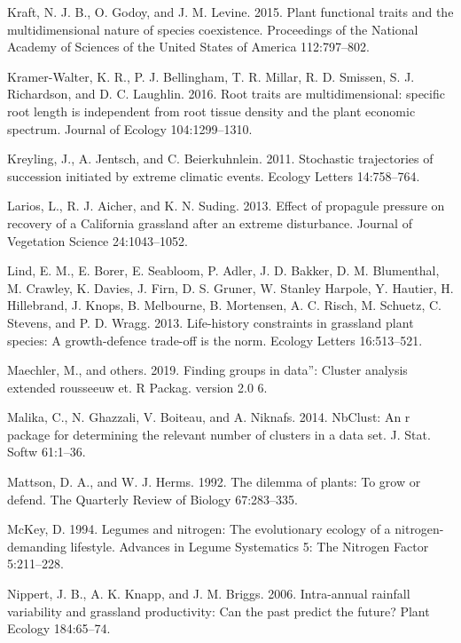 \documentclass[twoside,12pt,final]{ucthesis-CA2012}
\begin{document}
\begin{ucmainmatter}
\leavevmode\hypertarget{ref-Kraft2015}{}%
Kraft, N. J. B., O. Godoy, and J. M. Levine. 2015. Plant functional traits and the multidimensional nature of species coexistence. Proceedings of the National Academy of Sciences of the United States of America 112:797--802.

\leavevmode\hypertarget{ref-Kramer-Walter2016}{}%
Kramer-Walter, K. R., P. J. Bellingham, T. R. Millar, R. D. Smissen, S. J. Richardson, and D. C. Laughlin. 2016. Root traits are multidimensional: specific root length is independent from root tissue density and the plant economic spectrum. Journal of Ecology 104:1299--1310.

\leavevmode\hypertarget{ref-Kreyling2011}{}%
Kreyling, J., A. Jentsch, and C. Beierkuhnlein. 2011. Stochastic trajectories of succession initiated by extreme climatic events. Ecology Letters 14:758--764.

\leavevmode\hypertarget{ref-Larios2013}{}%
Larios, L., R. J. Aicher, and K. N. Suding. 2013. Effect of propagule pressure on recovery of a California grassland after an extreme disturbance. Journal of Vegetation Science 24:1043--1052.

\leavevmode\hypertarget{ref-Lind2013}{}%
Lind, E. M., E. Borer, E. Seabloom, P. Adler, J. D. Bakker, D. M. Blumenthal, M. Crawley, K. Davies, J. Firn, D. S. Gruner, W. Stanley Harpole, Y. Hautier, H. Hillebrand, J. Knops, B. Melbourne, B. Mortensen, A. C. Risch, M. Schuetz, C. Stevens, and P. D. Wragg. 2013. Life-history constraints in grassland plant species: A growth-defence trade-off is the norm. Ecology Letters 16:513--521.

\leavevmode\hypertarget{ref-Maechler2019}{}%
Maechler, M., and others. 2019. Finding groups in data'': Cluster analysis extended rousseeuw et. R Packag. version 2.0 6.

\leavevmode\hypertarget{ref-Charrad2014}{}%
Malika, C., N. Ghazzali, V. Boiteau, and A. Niknafs. 2014. NbClust: An r package for determining the relevant number of clusters in a data set. J. Stat. Softw 61:1--36.

\leavevmode\hypertarget{ref-Mattson1992}{}%
Mattson, D. A., and W. J. Herms. 1992. The dilemma of plants: To grow or defend. The Quarterly Review of Biology 67:283--335.

\leavevmode\hypertarget{ref-McKey1994}{}%
McKey, D. 1994. Legumes and nitrogen: The evolutionary ecology of a nitrogen-demanding lifestyle. Advances in Legume Systematics 5: The Nitrogen Factor 5:211--228.

\leavevmode\hypertarget{ref-Nippert2006}{}%
Nippert, J. B., A. K. Knapp, and J. M. Briggs. 2006. Intra-annual rainfall variability and grassland productivity: Can the past predict the future? Plant Ecology 184:65--74.


\end{ucmainmatter}
\end{document}
